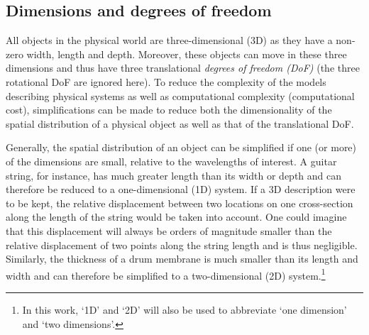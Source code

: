 

\subsection{Dimensions and degrees of freedom}\label{sec:dimensions}
All objects in the physical world are three-dimensional (3D) as they have a non-zero width, length and depth. Moreover, these objects can move in these three dimensions and thus have three translational \textit{degrees of freedom (DoF)} (the three rotational DoF are ignored here). 
To reduce the complexity of the models describing physical systems as well as computational complexity (computational cost), simplifications can be made to reduce both the dimensionality of the spatial distribution of a physical object as well as that of the translational DoF. 

Generally, the spatial distribution of an object can be simplified if one (or more) of the dimensions are small, relative to the wavelengths of interest. A guitar string, for instance, has much greater length than its width or depth and can therefore be reduced to a one-dimensional (1D) system. If a 3D description were to be kept, the relative displacement between two locations on one cross-section along the length of the string would be taken into account. One could imagine that this displacement will always be orders of magnitude smaller than the relative displacement of two points along the string length and is thus negligible. Similarly, the thickness of a drum membrane is much smaller than its length and width and can therefore be simplified to a two-dimensional (2D) system.\footnote{In this work, `1D' and `2D' will also be used to abbreviate `one dimension' and `two dimensions'.}  


